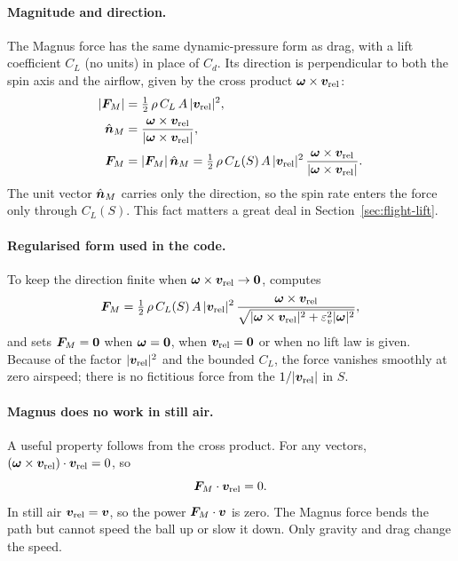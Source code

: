 \paragraph{Magnitude and direction.}
The Magnus force has the same dynamic-pressure form as drag, with a lift coefficient $C_L$ (no units)
in place of $C_d$.
Its direction is perpendicular to both the spin axis and the airflow, given by the cross product
$\bm{\omega}\times\bm{v}_{\mathrm{rel}}$:
\begin{align}
  |\bm{F}_M| &= \tfrac12\,\rho\,C_L\,A\,|\bm{v}_{\mathrm{rel}}|^2, \label{eq:flight-FMmag}\\
  \hat{\bm{n}}_M &= \frac{\bm{\omega}\times\bm{v}_{\mathrm{rel}}}{|\bm{\omega}\times\bm{v}_{\mathrm{rel}}|}, \label{eq:flight-nM}\\
  \bm{F}_M &= |\bm{F}_M|\,\hat{\bm{n}}_M
             = \tfrac12\,\rho\,C_L(S)\,A\,|\bm{v}_{\mathrm{rel}}|^2\,
               \frac{\bm{\omega}\times\bm{v}_{\mathrm{rel}}}{|\bm{\omega}\times\bm{v}_{\mathrm{rel}}|}. \label{eq:flight-FM}
\end{align}
The unit vector $\hat{\bm{n}}_M$ carries only the direction, so the spin rate enters the force
only through $C_L(S)$.
This fact matters a great deal in Section~\ref{sec:flight-lift}.

\paragraph{Regularised form used in the code.}
To keep the direction finite when $\bm{\omega}\times\bm{v}_{\mathrm{rel}}\to\bm{0}$, 
computes
\begin{equation}
  \bm{F}_M = \tfrac12\,\rho\,C_L(S)\,A\,|\bm{v}_{\mathrm{rel}}|^2\,
  \frac{\bm{\omega}\times\bm{v}_{\mathrm{rel}}}
       {\sqrt{|\bm{\omega}\times\bm{v}_{\mathrm{rel}}|^2 + \varepsilon_v^2|\bm{\omega}|^2}} ,
  \label{eq:flight-FM-reg}
\end{equation}
and sets $\bm{F}_M = \bm{0}$ when $\bm{\omega}=\bm{0}$, when $\bm{v}_{\mathrm{rel}}=\bm{0}$
or when no lift law is given.
Because of the factor $|\bm{v}_{\mathrm{rel}}|^2$ and the bounded $C_L$, the force vanishes smoothly
at zero airspeed; there is no fictitious force from the $1/|\bm{v}_{\mathrm{rel}}|$ in $S$.

\paragraph{Magnus does no work in still air.}
A useful property follows from the cross product.
For any vectors, $(\bm{\omega}\times\bm{v}_{\mathrm{rel}})\cdot\bm{v}_{\mathrm{rel}} = 0$, so
\begin{equation}
  \bm{F}_M\cdot\bm{v}_{\mathrm{rel}} = 0 .
  \label{eq:flight-FM-perp}
\end{equation}
In still air $\bm{v}_{\mathrm{rel}}=\bm{v}$, so the power $\bm{F}_M\cdot\bm{v}$ is zero.
The Magnus force bends the path but cannot speed the ball up or slow it down.
Only gravity and drag change the speed.

